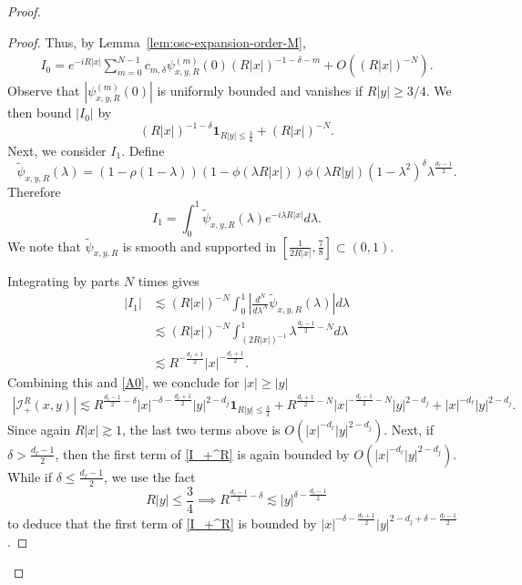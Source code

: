 \documentclass[12pt]{amsart}
\begin{document}
\begin{proof}
\begin{proof}
Thus, by Lemma~\ref{lem:osc-expansion-order-M},
\begin{align*}
    I_0 = e^{-iR|x|} \sum_{m=0}^{N-1} c_{m,\delta} \psi_{x,y,R}^{(m)}(0) (R|x|)^{-1-\delta-m} + O\left((R|x|)^{-N}\right).
\end{align*}
Observe that $|\psi_{x,y,R}^{(m)}(0)|$ is uniformly bounded and vanishes if $R|y|\ge 3/4$. We then bound $|I_0|$ by
\begin{equation}\label{A0}
    (R|x|)^{-1-\delta} \mathbf{1}_{R|y|\le \frac{3}{4}} + (R|x|)^{-N}.
\end{equation}
Next, we consider $I_1$. Define
\begin{equation*}
    \widetilde{\psi}_{x,y,R}(\lambda) = \left(1-\rho(1-\lambda)\right) (1-\phi(\lambda R|x|))\phi(\lambda R|y|)(1-\lambda^2)^\delta
\lambda^{\frac{d_\ell-1}{2}}.
\end{equation*}
Therefore
\begin{equation*}
    I_1 = \int_0^1 \widetilde{\psi}_{x,y,R}(\lambda) e^{-i\lambda R|x|} d\lambda.
\end{equation*}
We note that $\widetilde{\psi}_{x,y,R}$ is smooth and supported in $[\frac{1}{2R|x|}, \frac{7}{8}] \subset (0,1)$.

Integrating by parts $N$ times gives
\begin{align*}
    |I_1| &\lesssim (R|x|)^{-N} \int_0^1 \left| \frac{d^N}{d\lambda^N} \widetilde{\psi}_{x,y,R}(\lambda)     \right| d\lambda\\
    &\lesssim (R|x|)^{-N} \int_{(2R|x|)^{-1}}^1 \lambda^{\frac{d_\ell-1}{2} - N} d\lambda\\
    &\lesssim R^{-\frac{d_\ell+1}{2}} |x|^{-\frac{d_\ell+1}{2}}.
\end{align*}
Combining this and \eqref{A0}, we conclude for $|x|\ge |y|$
\begin{align}\label{I_+^R}
    |\mathcal{I}_+^R(x,y)| \lesssim R^{\frac{d_\ell-1}{2}-\delta} |x|^{-\delta - \frac{d_\ell+1}{2}} |y|^{2-d_j} \mathbf{1}_{R|y|\le \frac{3}{4}} + R^{\frac{d_\ell+1}{2}-N} |x|^{-\frac{d_\ell-1}{2}-N} |y|^{2-d_j} + |x|^{-d_\ell} |y|^{2-d_j}.
\end{align}
Since again $R|x|\gtrsim 1$, the last two terms above is $O(|x|^{-d_\ell} |y|^{2-d_j})$. Next, if $\delta > \frac{d_\ell-1}{2}$, then the first term of \eqref{I_+^R} is again bounded by $O(|x|^{-d_\ell} |y|^{2-d_j})$. While if $\delta \le \frac{d_\ell-1}{2}$, we use the fact 
\begin{equation*}
    R|y|\le \frac{3}{4} \implies R^{\frac{d_\ell-1}{2}-\delta} \lesssim |y|^{\delta - \frac{d_\ell-1}{2}}
\end{equation*}
to deduce that the first term of \eqref{I_+^R} is bounded by $|x|^{-\delta-\frac{d_\ell+1}{2}} |y|^{2-d_j+\delta-\frac{d_\ell-1}{2}}$.


\end{proof}
\end{proof}
\end{document}

